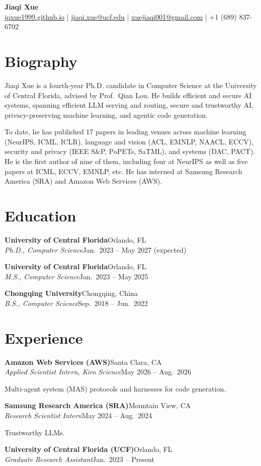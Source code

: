 \documentclass[letterpaper,10pt]{article}
\newcommand{\entry}[4]{%
  \textbf{#1}\hfill #2\\
  \textit{#3}\hfill #4\par\vspace{3pt}}
\newcommand{\entrydesc}[1]{\vspace{-2pt}#1\par\vspace{4pt}}
\begin{document}
\begin{center}
  {\fontsize{26}{30}\selectfont\bfseries Jiaqi Xue}\\[5pt]
  \small
  \href{https://jqxue1999.github.io}{jqxue1999.github.io}
  \quad|\quad
  \href{mailto:jiaqi.xue@ucf.edu}{jiaqi.xue@ucf.edu}
  \quad|\quad
  \href{mailto:xuejiaqi001@gmail.com}{xuejiaqi001@gmail.com}
  \quad|\quad
  +1 (689) 837-6702
\end{center}

\section{Biography}
Jiaqi Xue is a fourth-year Ph.D. candidate in Computer Science at the University of
Central Florida, advised by Prof.\ Qian Lou. He builds efficient and secure AI systems,
spanning efficient LLM serving and routing, secure and trustworthy AI, privacy-preserving
machine learning, and agentic code generation.

\vspace{4pt}
To date, he has published 17 papers in leading venues across machine learning
(NeurIPS, ICML, ICLR), language and vision (ACL, EMNLP, NAACL, ECCV), security and privacy
(IEEE S\&P, PoPETs, SaTML), and systems (DAC, PACT). He is the first author
of nine of them, including four at NeurIPS as well as five papers at ICML, ECCV, EMNLP, etc.
He has interned
at Samsung Research America (SRA) and Amazon Web Services (AWS).

\section{Education}
\entry{University of Central Florida}{Orlando, FL}
      {Ph.D., Computer Science}{Jan.\ 2023 -- May 2027 (expected)}
\entry{University of Central Florida}{Orlando, FL}
      {M.S., Computer Science}{Jan.\ 2023 -- May 2025}
\entry{Chongqing University}{Chongqing, China}
      {B.S., Computer Science}{Sep.\ 2018 -- Jun.\ 2022}

\section{Experience}
\entry{Amazon Web Services (AWS)}{Santa Clara, CA}
      {Applied Scientist Intern, Kiro Science}{May 2026 -- Aug.\ 2026}
\entrydesc{Multi-agent system (MAS) protocols and harnesses for code generation.}
\entry{Samsung Research America (SRA)}{Mountain View, CA}
      {Research Scientist Intern}{May 2024 -- Aug.\ 2024}
\entrydesc{Trustworthy LLMs.}
\entry{University of Central Florida (UCF)}{Orlando, FL}
      {Graduate Research Assistant}{Jan.\ 2023 -- Present}
\end{document}
